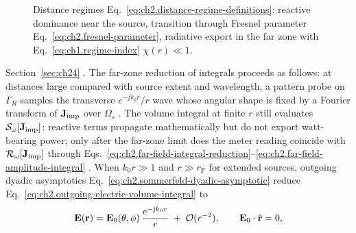 \begin{figure}[t]
\centering
{}
\caption{Distance regimes Eq.~\eqref{eq:ch2.distance-regime-definitions}: reactive
dominance near the source, transition through Fresnel parameter
Eq.~\eqref{eq:ch2.fresnel-parameter}, radiative export in the far zone with
Eq.~\eqref{eq:ch1.regime-index} \(\chi(r)\ll 1\).}
\label{fig:ch2.distance-regime-schematic}
\end{figure}
Section~\ref{sec:ch24} \cite{stratton1941}. The far-zone reduction of integrals proceeds as follows: at distances large compared with source extent and wavelength, a pattern probe on $\Gamma_R$
samples the transverse $e^{-\jj k_0 r}/r$ wave whose angular shape is fixed by a Fourier
transform of $\mathbf{J}_{\mathrm{imp}}$ over $\Omega_s$ \cite{jackson1999}. The volume integral at
finite $r$ still evaluates $\mathcal{S}_\omega[\mathbf{J}_{\mathrm{imp}}]$: reactive terms propagate mathematically
but do not export watt-bearing power; only after the far-zone limit does the meter reading
coincide with $\mathcal{R}_\omega[\mathbf{J}_{\mathrm{imp}}]$ through Eqs.~\eqref{eq:ch2.far-field-integral-reduction}--\eqref{eq:ch2.far-field-amplitude-integral}
\cite{stratton1941}. When
\(k_0 r\gg 1\) and \(r\gg r_{\mathrm{F}}\) for extended sources, outgoing dyadic
asymptotics Eq.~\eqref{eq:ch2.sommerfeld-dyadic-asymptotic} reduce
Eq.~\eqref{eq:ch2.outgoing-electric-volume-integral} to
\begin{equation}
\label{eq:ch2.far-field-integral-reduction}
\mathbf{E}(\mathbf{r})
=
\mathbf{E}_0(\theta,\phi)\,\frac{e^{-\mathrm{j} k_0 r}}{r}
\;+\;\mathcal{O}(r^{-2}),
\qquad
\mathbf{E}_0\cdot\hat{\mathbf{r}}=0,
\end{equation}
